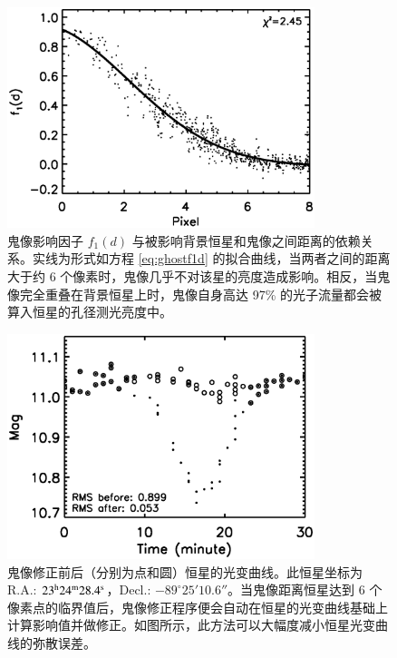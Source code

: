 \begin{figure}[ht!]
\centering
\includegraphics[width=0.8\textwidth, trim={0.5cm 0.3cm 0.5cm 0}]{figures/chapter2/f9_ghostfit.eps}
\caption{鬼像影响因子 $f_1(d)$ 与被影响背景恒星和鬼像之间距离的依赖关系。实线为形式如方程 \ref{eq:ghostf1d} 的拟合曲线，当两者之间的距离大于约 6 个像素时，鬼像几乎不对该星的亮度造成影响。相反，当鬼像完全重叠在背景恒星上时，鬼像自身高达 97\% 的光子流量都会被算入恒星的孔径测光亮度中。}
\label{fig:ghostfit}
\end{figure}

\begin{figure}[ht!]
\centering
\includegraphics[width=0.8\textwidth, trim={0.5cm 0.3cm 0.5cm 0}]{figures/chapter2/f10_deghost.eps}
\caption{鬼像修正前后（分别为点和圆）恒星的光变曲线。此恒星坐标为 R.A.: $23^\mathrm{h}24^\mathrm{m}28.4^\mathrm{s}$，Decl.: $-89^{\circ}25'10.6''$。当鬼像距离恒星达到 6 个像素点的临界值后，鬼像修正程序便会自动在恒星的光变曲线基础上计算影响值并做修正。如图所示，此方法可以大幅度减小恒星光变曲线的弥散误差。}
\label{fig:deghost}
\end{figure}



